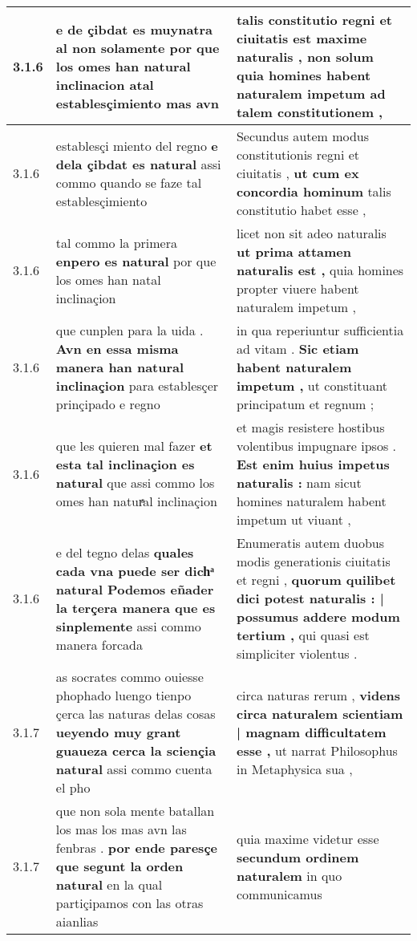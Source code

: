\begin{tabular}{|p{1cm}|p{6.5cm}|p{6.5cm}|}
3.1.6 & e de çibdat es muynatra al non solamente \textbf{ por que los omes han natural inclinacion } atal establesçimiento mas avn & talis constitutio regni et ciuitatis est maxime naturalis , \textbf{ non solum quia homines habent naturalem impetum } ad talem constitutionem , \\\hline
3.1.6 & establesçi miento del regno \textbf{ e dela çibdat es natural } assi commo quando se faze tal establesçimiento & Secundus autem modus constitutionis regni et ciuitatis , \textbf{ ut cum ex concordia hominum } talis constitutio habet esse , \\\hline
3.1.6 & tal commo la primera \textbf{ enpero es natural } por que los omes han natal inclinaçion & licet non sit adeo naturalis \textbf{ ut prima attamen naturalis est , } quia homines propter viuere habent naturalem impetum , \\\hline
3.1.6 & que cunplen para la uida . \textbf{ Avn en essa misma manera han natural inclinaçion } para establesçer prinçipado e regno & in qua reperiuntur sufficientia ad vitam . \textbf{ Sic etiam habent naturalem impetum , } ut constituant principatum et regnum ; \\\hline
3.1.6 & que les quieren mal fazer \textbf{ et esta tal inclinaçion es natural } que assi commo los omes han naturͣal inclinaçion & et magis resistere hostibus volentibus impugnare ipsos . \textbf{ Est enim huius impetus naturalis : } nam sicut homines naturalem habent impetum ut viuant , \\\hline
3.1.6 & e del tegno delas \textbf{ quales cada vna puede ser dichͣ natural Podemos eñader la terçera manera que es sinplemente } assi commo manera forcada & Enumeratis autem duobus modis generationis ciuitatis et regni , \textbf{ quorum quilibet dici potest naturalis : | possumus addere modum tertium , } qui quasi est simpliciter violentus . \\\hline
3.1.7 & as socrates commo ouiesse phophado luengo tienpo çerca las naturas delas cosas \textbf{ ueyendo muy grant guaueza cerca la sciençia natural } assi commo cuenta el pho & circa naturas rerum , \textbf{ videns circa naturalem scientiam | magnam difficultatem esse , } ut narrat Philosophus in Metaphysica sua , \\\hline
3.1.7 & que non sola mente batallan los mas los mas avn las fenbras . \textbf{ por ende paresçe que segunt la orden natural } en la qual partiçipamos con las otras aianlias & quia maxime videtur esse \textbf{ secundum ordinem naturalem } in quo communicamus \\\hline

\end{tabular}
